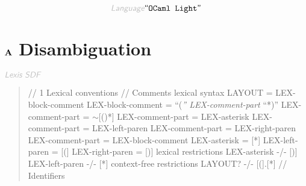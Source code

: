 \begin{displaymath}
\KEY{Language} \STRING{OCaml Light}
\end{displaymath}

\section*{$\SECT{A}$ Disambiguation}\hypertarget{secta-disambiguation}{}\label{secta-disambiguation}

$\KEY{Lexis SDF}$

\begin{quote}
// 1 Lexical conventions\newline
  \newline
// Comments\newline
\newline
lexical syntax\newline
\newline
  LAYOUT = LEX-block-comment\newline
  LEX-block-comment = {}``(\emph{{}'' LEX-comment-part} {}``*){}'' \newline
  \newline
  LEX-comment-part = \ensuremath{\sim}{[}()*{]}\newline
  LEX-comment-part = LEX-asterisk\newline
  LEX-comment-part = LEX-left-paren\newline
  LEX-comment-part = LEX-right-paren\newline
  LEX-comment-part = LEX-block-comment\newline
  \newline
  LEX-asterisk    = {[}*{]}\newline
  LEX-left-paren  = {[}({]} \newline
  LEX-right-paren = {[}){]}\newline
 \newline
lexical restrictions\newline
\newline
  LEX-asterisk   -/- {[}){]}\newline
  LEX-left-paren -/- {[}*{]}\newline
\newline
context-free restrictions\newline
\newline
  LAYOUT? -/- {[}({]}.{[}*{]}\newline
\newline
// Identifiers\newline
\newline

\end{quote}
